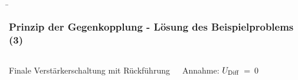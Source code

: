 \begin{frame}
{        \begin{block}{}
            
        \end{block}
    }	
   \b{\frametitle{Prinzip der Gegenkopplung - Lösung des Beispielproblems (3)}
    \begin{columns}
            \begin{center}
                
                Finale Verstärkerschaltung mit Rückführung
                \label{fig:Verschaltung des Verstärkers2}             
            \end{center}        
        Annahme: $U_{\textnormal{Diff}}$~=~0
        \end{columns} 
    }
 \end{frame}

